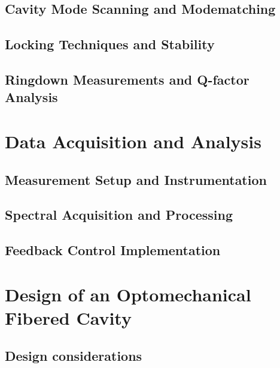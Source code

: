 \subsection{Cavity Mode Scanning and Modematching}
\subsection{Locking Techniques and Stability}
\subsection{Ringdown Measurements and Q-factor Analysis}
\section{Data Acquisition and Analysis}
\subsection{Measurement Setup and Instrumentation}
\subsection{Spectral Acquisition and Processing}
\subsection{Feedback Control Implementation}
\section{Design of an Optomechanical Fibered Cavity}
\subsection{Design considerations}
\newpage 

